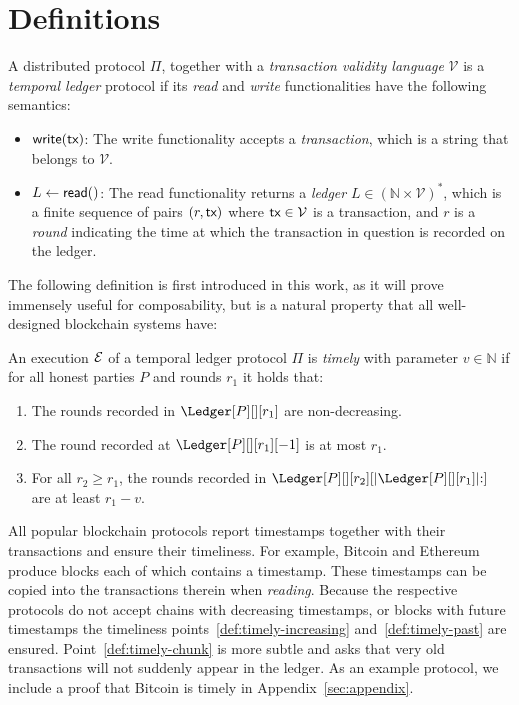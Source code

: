 \section{Definitions}

\begin{definition}
  A distributed protocol $\Pi$, together with a \emph{transaction validity language} $\mathcal{V}$
  is a \emph{temporal ledger} protocol if its \emph{read} and \emph{write}
  functionalities have the following semantics:

  \begin{itemize}
    \item $\textsf{write}(\textsf{tx})$: The write functionality accepts a \emph{transaction}, which is
          a string that belongs to $\mathcal{V}$.
    \item $L \gets \textsf{read}()$: The read functionality returns a \emph{ledger} $L \in (\mathbb{N} \times \mathcal{V})^*$, which is
          a finite sequence of pairs $(r, \textsf{tx})$ where $\textsf{tx} \in \mathcal{V}$ is a transaction, and
          $r$ is a \emph{round} indicating the time at which the transaction in question
          is recorded on the ledger.
  \end{itemize}
\end{definition}

The following definition is first introduced in this work,
as it will prove
immensely useful for composability, but is a natural property that all well-designed
blockchain systems have:

\begin{definition}[Timely]\label{def:timely}
  An execution $\mathcal{E}$ of a temporal ledger protocol $\Pi$ is \emph{timely} with parameter $v \in \mathbb{N}$
  if for all honest parties $P$ and rounds $r_1$ it holds that:

  \begin{enumerate}
    \item The rounds recorded in $\Ledger[P][][r_1]$ are non-decreasing.\label{def:timely-increasing}
    \item The round recorded at $\Ledger[P][][r_1][-1]$ is at most $r_1$.\label{def:timely-past}
    \item For all $r_2 \geq r_1$, the rounds recorded in $\Ledger[P][][r_2][|\Ledger[P][][r_1]|{:}]$ are at least $r_1 - v$.\label{def:timely-chunk}
  \end{enumerate}
\end{definition}

All popular blockchain protocols report timestamps together with their
transactions and ensure their timeliness. For example, Bitcoin and Ethereum
produce blocks each of which contains a timestamp. These timestamps can be copied
into the transactions therein when \emph{reading}. Because the respective protocols do not accept
chains with decreasing timestamps, or blocks with future timestamps the timeliness
points~\ref{def:timely-increasing} and~\ref{def:timely-past} are ensured.
Point~\ref{def:timely-chunk} is more subtle and asks that very old transactions will
not suddenly appear in the ledger. As an example protocol, we include a proof that Bitcoin is timely in
Appendix~\ref{sec:appendix}.

